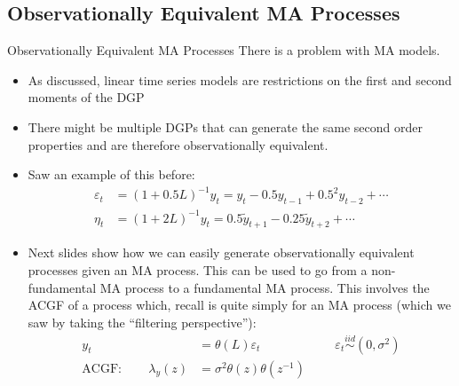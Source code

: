 \documentclass[aspectratio=169, handout]{beamer}
\newcommand{\iid}{\overset{iid}{\sim}}
\begin{document}



\subsection{Observationally Equivalent MA Processes}

{\scriptsize
\begin{frame}{Observationally Equivalent MA Processes}
There is a problem with MA models.
\begin{itemize}
  \item As discussed, linear time series models are restrictions on the
    first and second moments of the DGP
  \item There might be multiple DGPs that can generate the same second
    order properties and are therefore
    \alert{observationally equivalent}.
  \item Saw an example of this before:
    \begin{align*}
      \varepsilon_t
      &=
      (1+0.5L)^{-1}y_t
      =
      y_t-0.5 y_{t-1} + 0.5^2 y_{t-2} + \cdots
      \\
      \eta_t
      &=
      (1+2L)^{-1}y_t
      =
      0.5 \tilde{y}_{t+1} - 0.25 \tilde{y}_{t+2} + \cdots
    \end{align*}

  \item Next slides show how we can easily generate observationally
    equivalent processes given an MA process.
    This can be used to go from a non-fundamental MA process to a
    fundamental MA process.
    This involves the ACGF of a process which, recall is quite simply
    for an MA process (which we saw by taking the ``filtering
    perspective''):
    \begin{align*}
      y_t &= \theta(L)\varepsilon_t
      \qquad
      \qquad
      \qquad
      \varepsilon_t
      \iid
      (0,\sigma^2)
      \\
      \text{ACGF}:
      \qquad
      \lambda_y(z) &= \sigma^2 \theta(z)\theta(z^{-1})
    \end{align*}

\end{itemize}
\end{frame}
}
\end{document}
